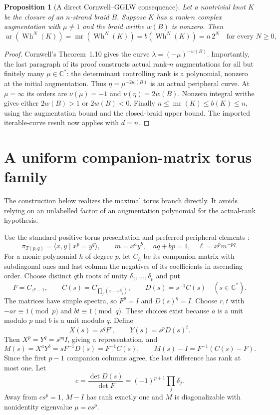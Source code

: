 \documentclass[11pt]{article}
\newtheorem{proposition}[theorem]{Proposition}
\newcommand{\mr}{\operatorname{mr}}
\newcommand{\ar}{\operatorname{ar}}
\newcommand{\Wh}{\operatorname{Wh}}
\newcommand{\C}{\mathbb C}
\begin{document}
\begin{proposition}[A direct Cornwell--GGLW consequence]\label{prop:braid}
Let a nontrivial knot $K$ be the closure of an $n$-strand braid $B$.
Suppose $K$ has a rank-$n$ complex augmentation with $\mu\ne1$ and
the braid writhe $w(B)$ is nonzero. Then
\[
 \ar(\Wh^N(K))=\mr(\Wh^N(K))=b(\Wh^N(K))=n\,2^N
 \quad\text{for every }N\ge0,
\]
\end{proposition}
\begin{proof}
Cornwell's Theorem~1.10 \cite{cor17} gives the curve
$\lambda=(-\mu)^{-w(B)}$. Importantly, the last paragraph of its
proof constructs actual rank-$n$ augmentations for all but finitely
many $\mu\in\C^*$: the determinant controlling rank is a polynomial,
nonzero at the initial augmentation. Thus $\eta=\mu^{-2w(B)}$ is an
actual peripheral curve. At $\mu=\infty$ its orders are
$\nu(\mu)=-1$ and $\nu(\eta)=2w(B)$. Nonzero integral writhe gives
either $2w(B)>1$ or $2w(B)<0$.
Finally $n\le\mr(K)\le b(K)\le n$, using the augmentation bound
and the closed-braid upper bound. The imported iterable-curve result
now applies with $d=n$.
\end{proof}

\section{A uniform companion-matrix torus family}

The construction below realizes the maximal torus branch directly.
It avoids relying on an unlabelled factor of an augmentation
polynomial for the actual-rank hypothesis.

Use the standard positive torus presentation and preferred peripheral
elements \cite[Section~5.1]{cor14}:
\[
 \pi_{T(p,q)}=\langle x,y\mid x^p=y^q\rangle,
 \qquad m=x^a y^b,\quad aq+bp=1,\quad \ell=x^pm^{-pq}.
\]
For a monic polynomial $h$ of degree $p$, let $C_h$ be its companion
matrix with subdiagonal ones and last column the negatives of its
coefficients in ascending order. Choose distinct $q$th roots of
unity $\delta_1,\ldots,\delta_p$ and put
\[
 F=C_{z^p-1},\qquad
 C(s)=C_{\prod_j(z-s\delta_j)},\qquad D(s)=s^{-1}C(s)
 \quad(s\in\C^*).
\]
The matrices have simple spectra, so $F^p=I$ and $D(s)^q=I$.
Choose $r,t$ with $-ar\equiv1\pmod p$ and $bt\equiv1\pmod q$.
These choices exist because $a$ is a unit modulo $p$ and $b$ is a
unit modulo $q$. Define
\[
 X(s)=s^qF^r,\qquad Y(s)=s^pD(s)^t.
\]
Then $X^p=Y^q=s^{pq}I$, giving a representation, and
\begin{equation}\label{eq:meridian}
 M(s)=X^aY^b=sF^{-1}D(s)=F^{-1}C(s),\qquad
 M(s)-I=F^{-1}(C(s)-F).
\end{equation}
Since the first $p-1$ companion columns agree, the last difference
has rank at most one. Let
\[
 c=\frac{\det D(s)}{\det F}
   =(-1)^{p+1}\prod_j\delta_j.
\]
Away from $cs^p=1$, $M-I$ has rank exactly one and $M$ is
diagonalizable with nonidentity eigenvalue $\mu=cs^p$.
\end{document}

